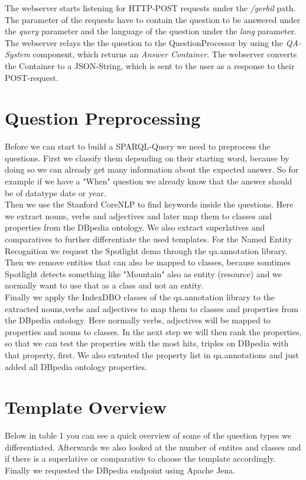 \documentclass[runningheads]{llncs}
\begin{document}
The webserver starts listening for HTTP-POST requests under the \emph{/gerbil} path. The parameter of the requests have to contain the question to be answered under the \emph{query} parameter and the language of the question under the \emph{lang} parameter. \\

The webserver relays the the question to the QuestionProcessor by using the \emph{QA-System} component, which returns an \emph{Answer Container}. The webserver converts the Container to a JSON-String, which is sent to the user as a response to their POST-request.

\section{Question Preprocessing} 
Before we can start to build a SPARQL-Query we need to preprocess the questions. First we classify them depending on their starting word, because by doing so we can already get many information about the expected answer. So for example if we have a "When" question we already know that the answer should be of datatype date or year. \\

Then we use the Stanford CoreNLP to find keywords inside the questions. Here we extract nouns, verbs and adjectives and later map them to classes and properties from the DBpedia ontology. We also extract superlatives and comparatives to further differentiate the used templates. For the Named Entity Recognition we request the Spotlight \cite{spotlight} demo through the qa.annotation library. Then we remove entities that can also be mapped to classes, because somtimes Spotlight detects something like "Mountain" also as entity (resource) and we normally want to use that as a class and not an entity. \\

Finally we apply the IndexDBO classes of the qa.annotation library to the extracted nouns,verbs and adjectives to map them to classes and properties from the DBpedia ontology. Here normally verbs, adjectives will be mapped
to properties and nouns to classes. In the next step we will then rank the properties, so that we can test the properties with the most hits, triples on DBpedia with that property, first. We also extented the property list in qa.annotations and just added all DBpedia ontology properties.

\section{Template Overview}
Below in table 1 you can see a quick overview of some of the question types we differentiated. Afterwards we also looked at the number of entites and classes and if there is a superlative or comparative to choose the template accordingly. Finally we requested the DBpedia endpoint using Apache Jena.
\end{document}
